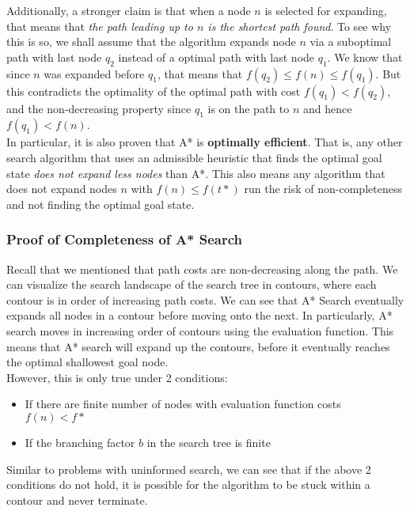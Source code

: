 \documentclass[12pt]{article}
\begin{document}
Additionally,  a stronger claim is that when a node $n$ is selected for expanding, that means that \textit{the path leading up to $n$ is the shortest path found}. To see why this is so, we shall assume that the algorithm expands node $n$ via a suboptimal path with last node $q_2$ instead of a optimal path with last node $q_1$. We know that since $n$ was expanded before $q_1$, that means that $f(q_2) \leq f(n) \leq f(q_1)$. But this contradicts the optimality of the optimal path with cost $f(q_1) < f(q_2)$, and the non-decreasing property since $q_1$ is on the path to $n$ and hence $f(q_1) < f(n)$.\\

In particular, it is also proven that A* is \textbf{optimally efficient}. That is, any other search algorithm that uses an admissible heuristic that finds the optimal goal state \textit{does not expand less nodes} than A*. This also means any algorithm that does not expand nodes $n$ with $f(n) 
\leq f(t*)$ run the risk of non-completeness and not finding the optimal goal state.

\subsubsection{Proof of Completeness of A* Search}

Recall that we mentioned that path costs are non-decreasing along the path. We can visualize the search landscape of the search tree in contours, where each contour is in order of increasing path costs. We can see that A* Search eventually expands all nodes in a contour before moving onto the next. In particularly, A* search moves in increasing order of contours using the evaluation function. This means that A* search will expand up the contours, before it eventually reaches the optimal shallowest goal node.\\

However, this is only true under 2 conditions:
\begin{itemize}
\item If there are finite number of nodes with evaluation function costs $f(n) < f*$
\item If the branching factor $b$ in the search tree is finite
\end{itemize}

Similar to problems with uninformed search, we can see that if the above 2 conditions do not hold, it is possible for the algorithm to be stuck within a contour and never terminate.
\end{document}
